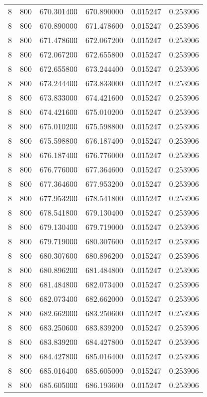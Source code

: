 \begin{longtable}{rrrrrr}
8 & 800 & 670.301400 & 670.890000 & 0.015247 & 0.253906 \\
8 & 800 & 670.890000 & 671.478600 & 0.015247 & 0.253906 \\
8 & 800 & 671.478600 & 672.067200 & 0.015247 & 0.253906 \\
8 & 800 & 672.067200 & 672.655800 & 0.015247 & 0.253906 \\
8 & 800 & 672.655800 & 673.244400 & 0.015247 & 0.253906 \\
8 & 800 & 673.244400 & 673.833000 & 0.015247 & 0.253906 \\
8 & 800 & 673.833000 & 674.421600 & 0.015247 & 0.253906 \\
8 & 800 & 674.421600 & 675.010200 & 0.015247 & 0.253906 \\
8 & 800 & 675.010200 & 675.598800 & 0.015247 & 0.253906 \\
8 & 800 & 675.598800 & 676.187400 & 0.015247 & 0.253906 \\
8 & 800 & 676.187400 & 676.776000 & 0.015247 & 0.253906 \\
8 & 800 & 676.776000 & 677.364600 & 0.015247 & 0.253906 \\
8 & 800 & 677.364600 & 677.953200 & 0.015247 & 0.253906 \\
8 & 800 & 677.953200 & 678.541800 & 0.015247 & 0.253906 \\
8 & 800 & 678.541800 & 679.130400 & 0.015247 & 0.253906 \\
8 & 800 & 679.130400 & 679.719000 & 0.015247 & 0.253906 \\
8 & 800 & 679.719000 & 680.307600 & 0.015247 & 0.253906 \\
8 & 800 & 680.307600 & 680.896200 & 0.015247 & 0.253906 \\
8 & 800 & 680.896200 & 681.484800 & 0.015247 & 0.253906 \\
8 & 800 & 681.484800 & 682.073400 & 0.015247 & 0.253906 \\
8 & 800 & 682.073400 & 682.662000 & 0.015247 & 0.253906 \\
8 & 800 & 682.662000 & 683.250600 & 0.015247 & 0.253906 \\
8 & 800 & 683.250600 & 683.839200 & 0.015247 & 0.253906 \\
8 & 800 & 683.839200 & 684.427800 & 0.015247 & 0.253906 \\
8 & 800 & 684.427800 & 685.016400 & 0.015247 & 0.253906 \\
8 & 800 & 685.016400 & 685.605000 & 0.015247 & 0.253906 \\
8 & 800 & 685.605000 & 686.193600 & 0.015247 & 0.253906 \\

\end{longtable}
